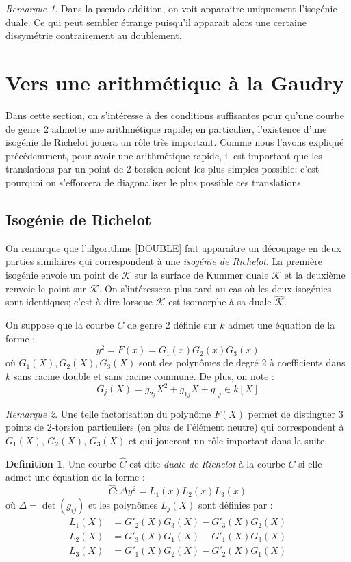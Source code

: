 \documentclass[a4paper,12pt]{article}
\theoremstyle{definition}
\newtheorem{definition}{Definition}[section]
\theoremstyle{remark}
\newtheorem{remarque}{Remarque}
\numberwithin{equation}{section}
\begin{document}
\begin{remarque}
Dans la pseudo addition, on voit apparaitre uniquement l'isogénie duale. Ce qui peut sembler étrange puisqu'il apparait alors une certaine dissymétrie contrairement au doublement.
\end{remarque}

\section{Vers une arithmétique à la Gaudry}

Dans cette section, on s'intéresse à des conditions suffisantes pour qu'une courbe de genre 2 admette une arithmétique rapide; en particulier, l'existence d'une isogénie de Richelot jouera un rôle très important. Comme nous l'avons expliqué précédemment, pour avoir une arithmétique rapide, il est important que les translations par un point de 2-torsion soient les plus simples possible; c'est pourquoi on s'efforcera de diagonaliser le plus possible ces translations.

\subsection{Isogénie de Richelot}

On remarque que l'algorithme \ref{DOUBLE} fait apparaître un découpage en deux parties similaires qui correspondent à une \emph{isogénie de Richelot}. La première isogénie envoie un point de $\mathcal{K}$ sur la surface de Kummer duale $\hat{\mathcal{K}}$ et la deuxième renvoie le point sur $\mathcal{K}$. On s'intéressera plus tard au cas où les deux isogénies sont identiques; c'est à dire lorsque $\mathcal{K}$ est isomorphe à sa duale $\hat{\mathcal{K}}$.

On suppose que la courbe $C$ de genre 2 définie sur $k$ admet une équation de la forme :
$$y^2 = F(x) = G_1(x)G_2(x)G_3(x)$$
où $G_1(X),G_2(X),G_3(X)$ sont des polynômes de degré 2 à coefficients dans $k$ sans racine double et sans racine commune. De plus, on note :
$$G_j(X) = g_{2j}X^2 + g_{1j}X + g_{0j} \in k[X]$$

\begin{remarque}
Une telle factorisation du polynôme $F(X)$ permet de distinguer 3 points de 2-torsion particuliers (en plus de l'élément neutre) qui correspondent à $G_1(X)$, $G_2(X)$, $G_3(X)$ et qui joueront un rôle important dans la suite.
\end{remarque}

\begin{definition}
Une courbe $\hat{C}$ est dite \emph{duale de Richelot} à la courbe $C$ si elle admet une équation de la forme :
$$\hat{C} : \Delta y^2 = L_1(x)L_2(x)L_3(x)$$
où $\Delta = \det(g_{ij})$ et les polynômes $L_j(X)$ sont définies par :
\begin{align*}
L_1(X) &= G'_2(X)G_3(X) - G'_3(X)G_2(X) \\
L_2(X) &= G'_3(X)G_1(X) - G'_1(X)G_3(X) \\
L_3(X) &= G'_1(X)G_2(X) - G'_2(X)G_1(X)
\end{align*}
\end{definition}
\end{document}
